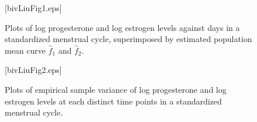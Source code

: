 \documentclass[article,lineno]{biometrika}
\begin{document}
\begin{figure}
\figurebox{20pc}{25pc}{}[bivLiuFig1.eps]
\caption{Plots of log progesterone  and log estrogen levels against days in a standardized menstrual cycle, superimposed by estimated population mean curve $\hat f_1$ and $\hat f_2$.}
\label{Liu1}
\end{figure}

\begin{figure}
\figurebox{20pc}{25pc}{}[bivLiuFig2.eps]
\caption{Plots of empirical sample variance of log progesterone  and log estrogen levels at each distinct time points in a standardized menstrual cycle.}
\label{Liu2}
\end{figure}
\end{document}
